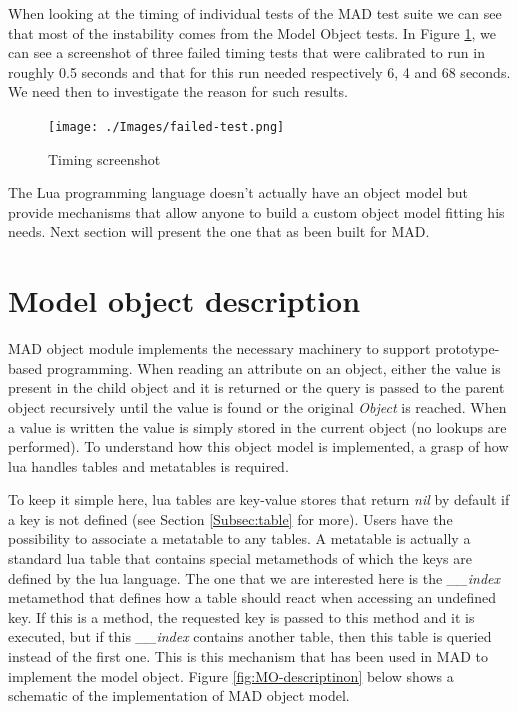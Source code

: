 
When looking at the timing of individual tests of the MAD test suite we can see
that most of the instability comes from the Model Object tests. In Figure
\ref{fig:failed-test}, we can see a screenshot of three failed timing tests that
were calibrated to run in roughly 0.5 seconds and that for this run needed respectively
6, 4 and 68 seconds. We need then to investigate the reason for such results.

\begin{figure}[H]
    \centering
	\texttt{[image: ./Images/failed-test.png]}
    \caption{Timing screenshot}
    \label{fig:failed-test}
\end{figure}

The Lua programming language doesn't actually have an object model but provide
mechanisms that allow anyone to build a custom object model fitting his needs.
Next section will present the one that as been built for MAD.


\section{Model object description}
\label{Sec:MO-descriptinon}

MAD object module implements the necessary machinery to support prototype-based
programming. When reading an attribute on an object, either the value is present
in the child object and it is returned or the query is passed to the parent
object recursively until the value is found or the original \emph{Object} is
reached. When a value is written the value is simply stored in the current
object (no lookups are performed). To understand how this object model is
implemented, a grasp of how lua handles tables and metatables is required.

To keep it simple here, lua tables are key-value stores that return \emph{nil} by
default if a key is not defined (see Section \ref{Subsec:table} for more).
Users have the possibility to associate a metatable to any tables. A metatable
is actually a standard lua table that contains special metamethods of which
the keys are defined by the lua language. The one that we are interested here is
the \emph{\_\_index} metamethod that defines how a table should react when accessing
an undefined key. If this is a method, the requested key is passed to this method
and it is executed, but if this \emph{\_\_index} contains another table, then this
table is queried instead of the first one. This is this mechanism that has been
used in MAD to implement the model object. Figure \ref{fig:MO-descriptinon} below
shows a schematic of the implementation of MAD object model.

